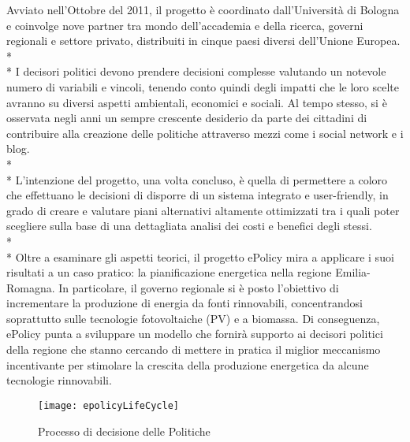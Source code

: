 \documentclass[12pt,a4paper,openright,twoside]{report}
\begin{document}
Avviato nell'Ottobre del 2011, il progetto è coordinato dall'Università di Bologna e coinvolge nove partner tra mondo dell'accademia e della ricerca, governi regionali e settore privato, distribuiti in cinque paesi diversi dell'Unione Europea.\\*\\*
I decisori politici devono prendere decisioni complesse valutando un notevole numero di variabili e vincoli, tenendo conto quindi degli impatti che le loro scelte avranno su diversi aspetti ambientali, economici e sociali. Al tempo stesso, si è osservata negli anni un sempre crescente desiderio da parte dei cittadini di contribuire alla creazione delle politiche attraverso mezzi come i social network e i blog.\\*\\*
L'intenzione del progetto, una volta concluso, è quella di permettere a coloro che effettuano le decisioni di disporre di un sistema integrato e user-friendly, in grado di creare e valutare piani alternativi altamente ottimizzati tra i quali poter scegliere sulla base di una dettagliata analisi dei costi e benefici degli stessi.\\*\\*
Oltre a esaminare gli aspetti teorici, il progetto ePolicy mira a applicare i suoi risultati a un caso pratico: la pianificazione energetica nella regione Emilia-Romagna. In particolare, il governo regionale si è posto l'obiettivo di incrementare la produzione di energia da fonti rinnovabili, concentrandosi soprattutto sulle tecnologie fotovoltaiche (PV) e a biomassa. Di conseguenza, ePolicy punta a sviluppare un modello che fornirà supporto ai decisori politici della regione che stanno cercando di mettere in pratica il miglior meccanismo incentivante per stimolare la crescita della produzione energetica da alcune tecnologie rinnovabili.

\begin{figure}[hbt]
	\centering
	\texttt{[image: epolicyLifeCycle]}
	\caption{Processo di decisione delle Politiche}
	\label{epolicyLifeCycle}
\end{figure}
\end{document}
